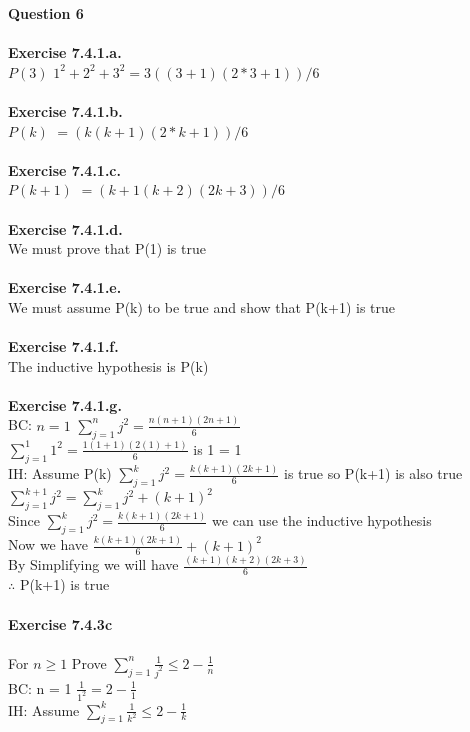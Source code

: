 \documentclass{article}
\begin{document}
\noindent \textbf{Question 6}\\\\
\textbf{Exercise  7.4.1.a.}\\
$P(3)$ $1^2 + 2^2 + 3^2 = 3((3 + 1)(2 * 3 + 1))/6$\\\\
\textbf{Exercise  7.4.1.b.}\\
$P(k)$ $= (k(k + 1)(2 * k + 1))/6$\\\\
\textbf{Exercise  7.4.1.c.}\\
$P(k+1)$ $= (k+1(k + 2)(2k + 3))/6$\\\\
\textbf{Exercise  7.4.1.d.}\\
We must prove that P(1) is true\\\\
\textbf{Exercise  7.4.1.e.}\\
We must assume P(k) to be true and show that P(k+1) is true\\\\
\textbf{Exercise  7.4.1.f.}\\
The inductive hypothesis is P(k)\\\\
\textbf{Exercise  7.4.1.g.}\\
BC: $n = 1$ $\sum_{j=1}^{n} j^2 = \frac{n(n+1)(2n+1)}{6}$\\
$\sum_{j=1}^{1} 1^2 = \frac{1(1+1)(2(1)+1)}{6}$ is 1 = 1\\
IH: Assume P(k) $\sum_{j=1}^{k} j^2 = \frac{k(k+1)(2k+1)}{6}$ is true so P(k+1) is also true\\
$\sum_{j=1}^{k+1} j^2 = \sum_{j=1}^{k} j^2 + (k+1)^2$\\
Since $\sum_{j=1}^{k} j^2 = \frac{k(k+1)(2k+1)}{6}$ we can use the inductive hypothesis\\
Now we have $\frac{k(k+1)(2k+1)}{6} + (k+1)^2$\\
By Simplifying we will have $\frac{(k+1)(k+2)(2k+3)}{6}$\\
$\therefore$ P(k+1) is true\\\\
\textbf{Exercise  7.4.3c}\\\\
For $n\geq 1$ Prove $\sum_{j=1}^{n} \frac{1}{j^2} \leq 2-\frac{1}{n}$\\
BC: n = 1 $\frac{1}{1^2} = 2 - \frac{1}{1}$\\
IH: Assume $\sum_{j=1}^{k} \frac{1}{k^2} \leq 2 - \frac{1}{k}$\\
\end{document}
